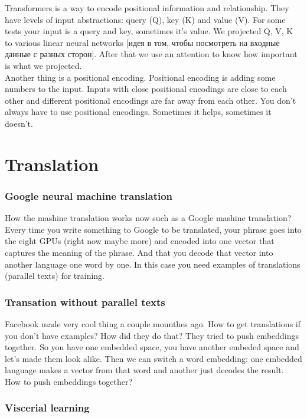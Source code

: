 Transformers is a way to encode positional information and relationship. They have levels of input abstractions: query (Q), key (K) and value (V). For some tests your input is a query and key, sometimes it's value. We projected Q, V, K to various linear neural networks [идея в том, чтобы посмотреть на входные данные с разных сторон]. After that we use an attention to know how important is what we projected.\\
Another thing is a positional encoding. Positional encoding is adding some numbers to the input. Inputs with close positional encodings are close to each other and different positional encodings are far away from each other. You don't always have to use positional encodings. Sometimes it helps, sometimes it doesn't.

\section{Translation}
\vspace{-0.6cm}
\subsubsection*{Google neural machine translation}

How the mashine translation works now such as a Google mashine translation? Every time you write something to Google to be translated, your phrase goes into the eight GPUs (right now maybe more) and encoded into one vector that captures the meaning of the phrase. And that you decode that vector into another language one word by one. In this case you need examples of translations (parallel texts) for training.

\subsubsection*{Transation without parallel texts}

Facebook made very cool thing a couple mounthes ago. How to get translations if you don't have examples? How did they do that? They tried to push embeddings together. So you have one embedded space, you have another embeded space and let's made them look alike. Then we can switch a word embedding: one embedded language makes a vector from that word and another just decodes the result. How to push embeddings together?

\subsubsection*{Viscerial learning}

